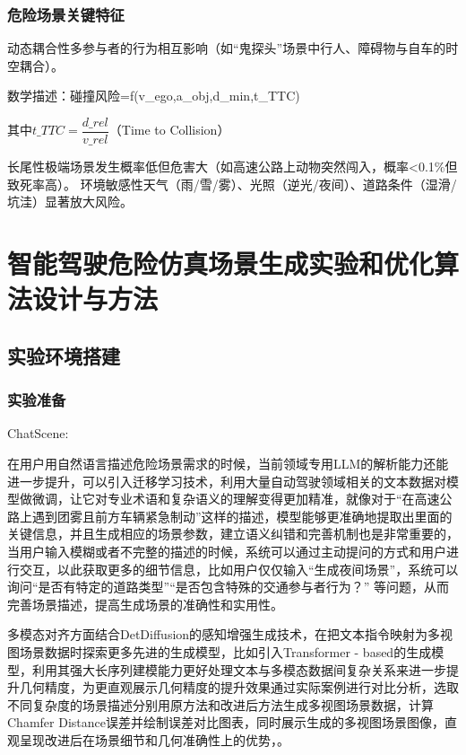 \subsection{危险场景关键特征}

动态耦合性多参与者的行为相互影响（如“鬼探头”场景中行人、障碍物与自车的时空耦合）。

数学描述：碰撞风险=f(v\_{ego},a\_{obj},d\_{min},t\_{TTC})

其中$ t\_{TTC}=\dfrac{d\_{rel}}{v\_{rel}}$（Time to Collision）

长尾性极端场景发生概率低但危害大（如高速公路上动物突然闯入，概率<0.1\%但致死率高）。
环境敏感性天气（雨/雪/雾）、光照（逆光/夜间）、道路条件（湿滑/坑洼）显著放大风险。


\chapter{智能驾驶危险仿真场景生成实验和优化算法设计与方法}

\section{实验环境搭建}
\subsection{实验准备}

ChatScene:

在用户用自然语言描述危险场景需求的时候，当前领域专用LLM的解析能力还能进一步提升，可以引入迁移学习技术，利用大量自动驾驶领域相关的文本数据对模型做微调，让它对专业术语和复杂语义的理解变得更加精准，就像对于“在高速公路上遇到团雾且前方车辆紧急制动”这样的描述，模型能够更准确地提取出里面的关键信息，并且生成相应的场景参数，建立语义纠错和完善机制也是非常重要的，当用户输入模糊或者不完整的描述的时候，系统可以通过主动提问的方式和用户进行交互，以此获取更多的细节信息，比如用户仅仅输入“生成夜间场景”，系统可以询问“是否有特定的道路类型”“是否包含特殊的交通参与者行为？” 等问题，从而完善场景描述，提高生成场景的准确性和实用性。​


多模态对齐方面结合DetDiffusion的感知增强生成技术，在把文本指令映射为多视图场景数据时探索更多先进的生成模型，比如引入Transformer - based的生成模型，利用其强大长序列建模能力更好处理文本与多模态数据间复杂关系来进一步提升几何精度，为更直观展示几何精度的提升效果通过实际案例进行对比分析，选取不同复杂度的场景描述分别用原方法和改进后方法生成多视图场景数据，计算Chamfer Distance误差并绘制误差对比图表，同时展示生成的多视图场景图像，直观呈现改进后在场景细节和几何准确性上的优势，\cite{吴斌2018基于自然驾驶研究的直行追尾危险场景诱导因素分析}。​


